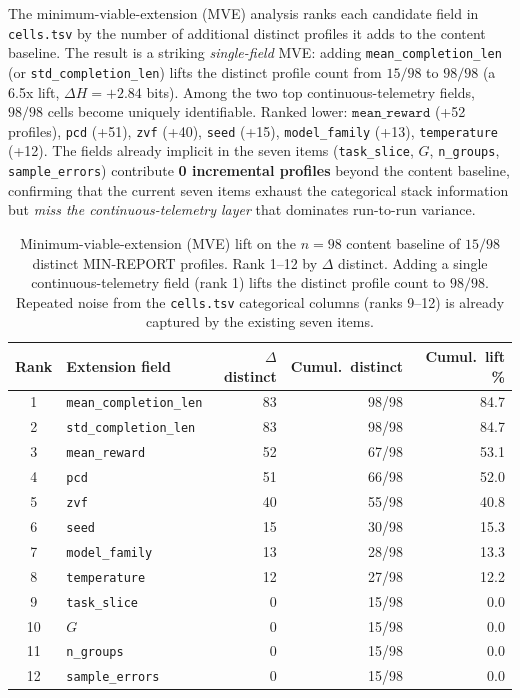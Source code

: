 The minimum-viable-extension (MVE) analysis ranks each candidate field
in \texttt{cells.tsv} by the number of additional distinct profiles it
adds to the content baseline. The result is a striking
\emph{single-field} MVE: adding \texttt{mean\_completion\_len} (or
\texttt{std\_completion\_len}) lifts the distinct profile count from
$15/98$ to $98/98$ (a 6.5x lift, $\Delta H = +2.84$ bits). Among the
two top continuous-telemetry fields, $98/98$ cells become uniquely
identifiable. Ranked lower:
$\texttt{mean\_reward}$ (+52 profiles), \texttt{pcd} (+51),
\texttt{zvf} (+40), \texttt{seed} (+15), \texttt{model\_family}
(+13), \texttt{temperature} (+12). The fields already implicit in the
seven items (\texttt{task\_slice}, $G$, \texttt{n\_groups},
\texttt{sample\_errors}) contribute \textbf{0 incremental profiles}
beyond the content baseline, confirming that the current seven items
exhaust the categorical stack information but \emph{miss the
continuous-telemetry layer} that dominates run-to-run variance.

\begin{table}[t]
\centering\small
\caption{Minimum-viable-extension (MVE) lift on the $n{=}98$ content
baseline of $15/98$ distinct MIN-REPORT profiles. Rank 1--12 by
$\Delta$ distinct. Adding a single continuous-telemetry field (rank 1)
lifts the distinct profile count to $98/98$. Repeated noise from the
\texttt{cells.tsv} categorical columns (ranks 9--12) is already
captured by the existing seven items.}
\label{tab:p5-mve}
\begin{tabular}{@{}clrrr@{}}
\toprule
Rank & Extension field & $\Delta$ distinct & Cumul.\ distinct & Cumul.\ lift \% \\
\midrule
1 & \texttt{mean\_completion\_len} & 83 & 98/98 & 84.7 \\
2 & \texttt{std\_completion\_len}  & 83 & 98/98 & 84.7 \\
3 & \texttt{mean\_reward}         & 52 & 67/98 & 53.1 \\
4 & \texttt{pcd}                  & 51 & 66/98 & 52.0 \\
5 & \texttt{zvf}                  & 40 & 55/98 & 40.8 \\
6 & \texttt{seed}                 & 15 & 30/98 & 15.3 \\
7 & \texttt{model\_family}        & 13 & 28/98 & 13.3 \\
8 & \texttt{temperature}          & 12 & 27/98 & 12.2 \\
9 & \texttt{task\_slice}           &  0 & 15/98 &  0.0 \\
10& $G$                           &  0 & 15/98 &  0.0 \\
11& \texttt{n\_groups}            &  0 & 15/98 &  0.0 \\
12& \texttt{sample\_errors}       &  0 & 15/98 &  0.0 \\
\bottomrule
\end{tabular}
\end{table}

